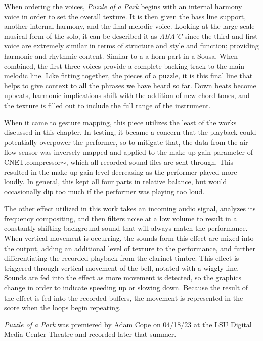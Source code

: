 When ordering the voices, \textit{Puzzle of a Park} begins with an internal harmony voice in order to set the overall texture. It is then given the bass line support, another internal harmony, and the final melodic voice. Looking at the large-scale musical form of the solo, it can be described it as \emph{ABA'C} since the third and first voice are extremely similar in terms of structure and style and function; providing harmonic  and rhythmic content. Similar to a a horn part in a Sousa. When combined, the first three voices provide a complete backing track to the main melodic line. Like fitting together, the pieces of a puzzle, it is this final line that helps to give context to all the phrases we have heard so far. Down beats become upbeats, harmonic implications shift with the addition of new chord tones, and the texture is filled out to include the full range of the instrument.

When it came to gesture mapping, this piece utilizes the least of the works discussed in this chapter. In testing, it became a concern that the playback could potentially overpower the performer, so to mitigate that, the data from the air flow sensor was inversely mapped and applied to the make up gain parameter of CNET.compressor$\sim$, which all recorded sound files are sent through. This resulted in the make up gain level decreasing as the performer played more loudly. In general, this kept all four parts in relative balance, but would occasionally dip too much if the performer was playing too loud.

The other effect utilized in this work  takes an incoming audio signal, analyzes its frequency compositing, and then filters noise at a low volume to result in a constantly shifting background sound that will always match the performance. When vertical movement is occurring, the sounds form this effect are mixed into the output, adding an additional level of texture to the performance, and further differentiating the recorded playback from the clarinet timbre. This effect is triggered through vertical movement of the bell, notated with a wiggly line. Sounds are fed into the effect as more movement is detected, so the graphics change in order to indicate speeding up or slowing down. Because the result of the effect is fed into the recorded buffers, the movement is represented in the score when the loops begin repeating.

\textit{Puzzle of a Park} was premiered by Adam Cope on 04/18/23 at the LSU Digital Media Center Theatre and recorded later that summer.

